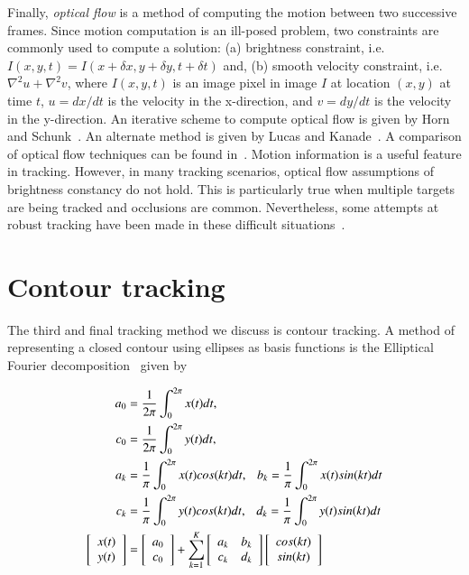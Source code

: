 Finally, \emph{optical flow} is a method of computing the motion between two successive frames.  Since motion computation is an ill-posed problem, two constraints are commonly used to compute a solution: (a) brightness constraint, i.e. $I(x,y,t) = I(x+\delta x,y+\delta y,t+\delta t)$ and, (b) smooth velocity constraint, i.e. $\nabla^2 u + \nabla^2 v$, where $I(x,y,t)$ is an image pixel in image $I$ at location $(x,y)$ at time $t$, $u=dx/dt$ is the velocity in the x-direction, and $v=dy/dt$ is the velocity in the y-direction.  An iterative scheme to compute optical flow is given by Horn and Schunk~\cite{1981_JNL_OpticalFlow_HornSchunck}.  An alternate method is given by Lucas and Kanade~\cite{1981_CNF_IterativeImageRegistration_LucasKanade}.  A comparison of optical flow techniques can be found in~\cite{1994_JNL_PerfOpticalFlow_Barron}.  Motion information is a useful feature in tracking.  However, in many tracking scenarios, optical flow assumptions of brightness constancy do not hold.  This is particularly true when multiple targets are being tracked and occlusions are common.  Nevertheless, some attempts at robust tracking have been made in these difficult situations~\cite{1996_CNF_MultipleMotionsFlowFields_Black}.

\section{Contour tracking}
The third and final tracking method we discuss is contour tracking.   A method of representing a closed contour using ellipses as basis functions is the Elliptical Fourier decomposition~\cite{1982_JNL_EllipticalFourier_Kuhl} given by

\begin{align}
\centering
	\label{eq:EllipticalFourierTransform}
	a_0&=\frac{1}{2\pi}\int_0^{2 \pi}x(t)dt,       \notag\\ 
	c_0&=\frac{1}{2\pi}\int_0^{2 \pi}y(t)dt,       \notag\\ 
	a_k&=\frac{1}{\pi}\int_0^{2 \pi}x(t)cos(kt)dt,   \ \ \   b_k=\frac{1}{\pi}\int_0^{2 \pi}x(t)sin(kt)dt    \notag\\
	c_k&=\frac{1}{\pi}\int_0^{2 \pi}y(t)cos(kt)dt,    \ \ \  d_k=\frac{1}{\pi}\int_0^{2 \pi}y(t)sin(kt)dt    \notag\\
	\left[ \begin{array}{ccc}x(t) \\y(t) \end{array}\right] &=\left[ \begin{array}{ccc}a_0\\c_0 \end{array}\right] + \sum_{k=1}^K \left[ \begin{array}{ccc}a_k & b_k\\c_k & d_k \end{array}\right]\left[ \begin{array}{ccc}cos(kt)\\sin(kt) \end{array}\right]
\end{align}

